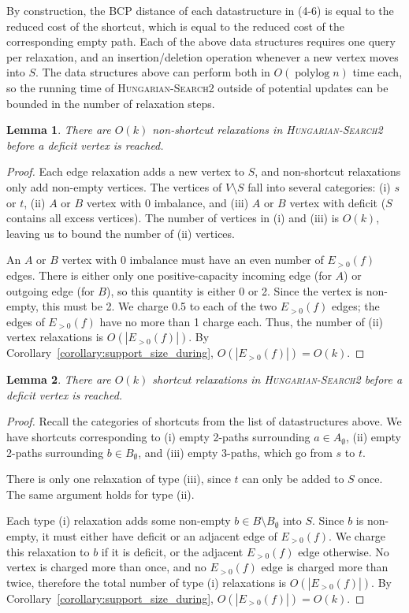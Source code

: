 \documentclass[11pt]{article}
\def\polylog{\mathop{\mathrm{polylog}}}
\theoremstyle{plain}
\newtheorem{lemma}{Lemma}[section]
\numberwithin{figure}{section}
\begin{document}
By construction, the BCP distance of each datastructure in (4-6) is equal to
the reduced cost of the shortcut, which is equal to the reduced cost of the
corresponding empty path.
Each of the above data structures requires one query per relaxation, and an
insertion/deletion operation whenever a new vertex moves into $S$.
The data structures above can perform both in $O(\polylog n)$ time each, so the
running time of \textsc{Hungarian-Search2} outside of potential updates can be
bounded in the number of relaxation steps.

\begin{lemma}
\label{lemma:goldberg_hs_length1}
There are $O(k)$ non-shortcut relaxations in \textsc{Hungarian-Search2} before
a deficit vertex is reached.
\end{lemma}

\begin{proof}
Each edge relaxation adds a new vertex to $S$, and non-shortcut relaxations
only add non-empty vertices.
The vertices of $V \setminus S$ fall into several categories:
(i) $s$ or $t$, (ii) $A$ or $B$ vertex with 0 imbalance, and (iii) $A$ or $B$
vertex with deficit ($S$ contains all excess vertices).
The number of vertices in (i) and (iii) is $O(k)$, leaving us to bound the
number of (ii) vertices.

An $A$ or $B$ vertex with 0 imbalance must have an even number of $E_{>0}(f)$
edges.
There is either only one positive-capacity incoming edge (for $A$) or outgoing
edge (for $B$), so this quantity is either 0 or 2.
Since the vertex is non-empty, this must be 2.
We charge 0.5 to each of the two $E_{>0}(f)$ edges; the edges of $E_{>0}(f)$
have no more than 1 charge each.
Thus, the number of (ii) vertex relaxations is $O(|E_{>0}(f)|)$.
By Corollary~\ref{corollary:support_size_during}, $O(|E_{>0}(f)|) = O(k)$.
\end{proof}

\begin{lemma}
\label{lemma:goldberg_hs_length2}
There are $O(k)$ shortcut relaxations in \textsc{Hungarian-Search2} before a
deficit vertex is reached.
\end{lemma}

\begin{proof}
Recall the categories of shortcuts from the list of datastructures above.
We have shortcuts corresponding to (i) empty 2-paths surrounding
$a \in A_\emptyset$, (ii) empty 2-paths surrounding $b \in B_\emptyset$, and
(iii) empty 3-paths, which go from $s$ to $t$.

There is only one relaxation of type (iii), since $t$ can only be added to $S$
once.
The same argument holds for type (ii).

Each type (i) relaxation adds some non-empty $b \in B \setminus B_\emptyset$
into $S$.
Since $b$ is non-empty, it must either have deficit or an adjacent edge of
$E_{>0}(f)$.
We charge this relaxation to $b$ if it is deficit, or the adjacent $E_{>0}(f)$
edge otherwise.
No vertex is charged more than once, and no $E_{>0}(f)$ edge is charged more
than twice, therefore the total number of type (i) relaxations is
$O(|E_{>0}(f)|)$.
By Corollary~\ref{corollary:support_size_during}, $O(|E_{>0}(f)|) = O(k)$.
\end{proof}
\end{document}
